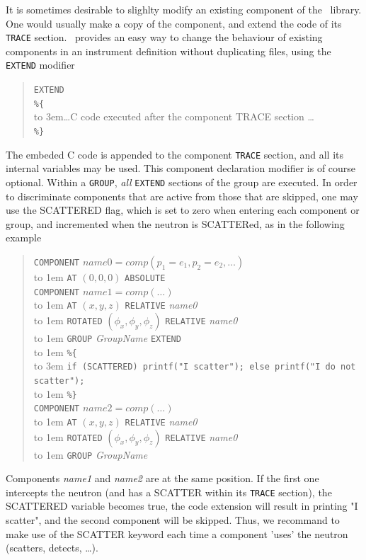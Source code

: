 It is sometimes desirable to slighlty modify an existing component of the \MCS\ library. One would usually make a copy of the component, and extend the code of its \texttt{TRACE} section. \MCS\ provides an easy way to change the behaviour of existing components in an instrument definition without duplicating files, using the \texttt{EXTEND} modifier 
\begin{quote}
  \texttt{EXTEND} \\
  \verb|%{| \\
  \hbox to 3em{}\ldots C code executed after the component TRACE section \ldots \\
  \verb|%}|
\end{quote} 
The embeded C code is appended to the component \texttt{TRACE} section, and all its internal variables may be used.
This component declaration modifier is of course optional. Within a \texttt{GROUP}, \emph{all} \texttt{EXTEND} sections of the group are executed. In order to discriminate components that are active from those that are skipped, one may use the SCATTERED flag, which is set to zero when entering each component or group, and incremented when the neutron is SCATTERed, as in the following example  
\begin{quote}
  \texttt{COMPONENT} $\textit{name0} =
    \textit{comp}(p_1 = e_1, p_2 = e_2, \ldots)$ \\
  \hbox to 1em{} \texttt{AT} $(0,0,0)$ \texttt{ABSOLUTE} \\
  \texttt{COMPONENT} $\textit{name1} =
    \textit{comp}(\ldots)$ \\
  \hbox to 1em{} \texttt{AT} $(x,y,z)$ \texttt{RELATIVE} \textit{name0} \\
  \hbox to 1em{} \texttt{ROTATED} $(\phi_x,\phi_y,\phi_z)$ \texttt{RELATIVE} \textit{name0} \\
  \hbox to 1em{} \texttt{GROUP} \textit{GroupName} \texttt{EXTEND} \\
  \hbox to 1em{} \verb|%{| \\
  \hbox to 3em{} \verb+if (SCATTERED) printf("I scatter"); else printf("I do not scatter");+\\
  \hbox to 1em{} \verb|%}| \\
  \texttt{COMPONENT} $\textit{name2} =
    \textit{comp}(\ldots)$ \\
  \hbox to 1em{} \texttt{AT} $(x,y,z)$ \texttt{RELATIVE} \textit{name0} \\
  \hbox to 1em{} \texttt{ROTATED} $(\phi_x,\phi_y,\phi_z)$ \texttt{RELATIVE} \textit{name0} \\
  \hbox to 1em{} \texttt{GROUP} \textit{GroupName}
\end{quote}
Components \emph{name1} and \emph{name2} are at the same position. If the first one intercepts the neutron (and has a SCATTER within its \texttt{TRACE} section), the SCATTERED variable becomes true, the code extension will result in printing "I scatter", and the second component will be skipped.
Thus, we recommand to make use of the SCATTER keyword each time a component 'uses' the neutron (scatters, detects, \ldots).


